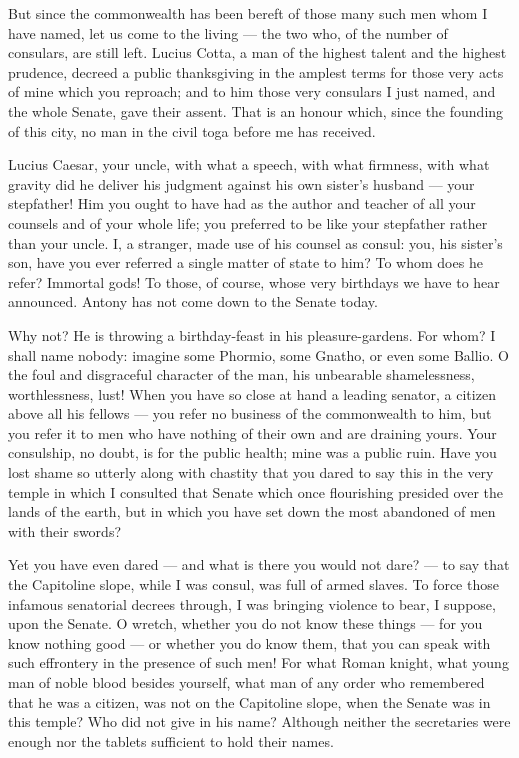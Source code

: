  But since the commonwealth has been bereft of those many such men whom I have named, let us come to the living --- the two who, of the number of consulars, are still left. Lucius Cotta, a man of the highest talent and the highest prudence, decreed a public thanksgiving in the amplest terms for those very acts of mine which you reproach; and to him those very consulars I just named, and the whole Senate, gave their assent. That is an honour which, since the founding of this city, no man in the civil toga before me has received.

 Lucius Caesar, your uncle, with what a speech, with what firmness, with what gravity did he deliver his judgment against his own sister's husband --- your stepfather! Him you ought to have had as the author and teacher of all your counsels and of your whole life; you preferred to be like your stepfather rather than your uncle. I, a stranger, made use of his counsel as consul: you, his sister's son, have you ever referred a single matter of state to him? To whom does he refer? Immortal gods! To those, of course, whose very birthdays we have to hear announced. Antony has not come down to the Senate today.

 Why not? He is throwing a birthday-feast in his pleasure-gardens. For whom? I shall name nobody: imagine some Phormio, some Gnatho, or even some Ballio. O the foul and disgraceful character of the man, his unbearable shamelessness, worthlessness, lust! When you have so close at hand a leading senator, a citizen above all his fellows --- you refer no business of the commonwealth to him, but you refer it to men who have nothing of their own and are draining yours. Your consulship, no doubt, is for the public health; mine was a public ruin. Have you lost shame so utterly along with chastity that you dared to say this in the very temple in which I consulted that Senate which once flourishing presided over the lands of the earth, but in which you have set down the most abandoned of men with their swords?

 Yet you have even dared --- and what is there you would not dare? --- to say that the Capitoline slope, while I was consul, was full of armed slaves. To force those infamous senatorial decrees through, I was bringing violence to bear, I suppose, upon the Senate. O wretch, whether you do not know these things --- for you know nothing good --- or whether you do know them, that you can speak with such effrontery in the presence of such men! For what Roman knight, what young man of noble blood besides yourself, what man of any order who remembered that he was a citizen, was not on the Capitoline slope, when the Senate was in this temple? Who did not give in his name? Although neither the secretaries were enough nor the tablets sufficient to hold their names.

